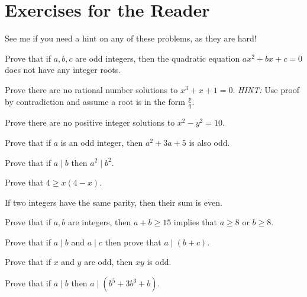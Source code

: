 \section{Exercises for the Reader}

See me if you need a hint on any of these problems, as they are hard!

\begin{prob}  Prove that if $a,b,c$ are odd integers, then the quadratic equation $ax^2+bx+c=0$ does not have any integer roots. \end{prob}

\begin{prob}  Prove there are no rational number solutions to $x^3+x+1=0$.  \textit{HINT:} Use proof by contradiction and assume a root is in the form $\frac{p}{q}$.  \end{prob}  

\begin{prob}   Prove there are no positive integer solutions to $x^2-y^2=10$.  \end{prob}  

\begin{prob}  Prove that if $a$ is an odd integer, then $a^2+3a+5$ is also odd.  \end{prob}  

\begin{prob}  Prove that if $a\mid b$ then $a^2\mid b^2$.  \end{prob}  

\begin{prob}  Prove that $4\ge x(4-x)$.  \end{prob}

\begin{prob}  If two integers have the same parity, then their sum is even. \end{prob}

\begin{prob}  Prove that if $a,b$ are integers, then $a+b\ge 15$ implies that $a\ge 8$ or $b\ge 8$.  \end{prob}

\begin{prob}  Prove that if $a\mid b$ and $a\mid c$ then prove that $a\mid (b+c)$.  \end{prob}

\begin{prob}  Prove that if $x$ and $y$ are odd, then $xy$ is odd.  \end{prob}  

\begin{prob}  Prove that if $a\mid b$ then $a\mid (b^5+3b^3+b)$.  \end{prob}

